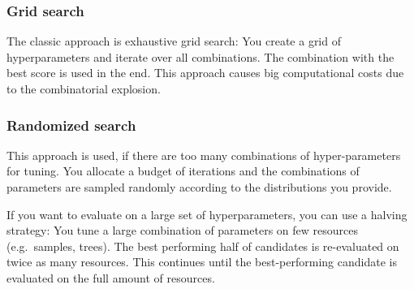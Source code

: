 \documentclass[
]{book}
\begin{document}
\hypertarget{grid-search}{%
\subsubsection{Grid search}\label{grid-search}}

The classic approach is exhaustive grid search: You create a grid of
hyperparameters and iterate over all combinations. The combination with
the best score is used in the end. This approach causes big
computational costs due to the combinatorial explosion.

\hypertarget{randomized-search}{%
\subsubsection{Randomized search}\label{randomized-search}}

This approach is used, if there are too many combinations of
hyper-parameters for tuning. You allocate a budget of iterations and the
combinations of parameters are sampled randomly according to the
distributions you provide.

If you want to evaluate on a large set of hyperparameters, you can use a
halving strategy: You tune a large combination of parameters on few
resources (e.g.~samples, trees). The best performing half of candidates
is re-evaluated on twice as many resources. This continues until the
best-performing candidate is evaluated on the full amount of resources.
\end{document}
